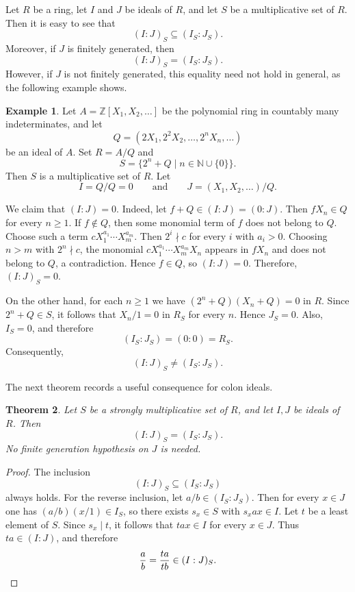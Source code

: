 \documentclass[11pt]{amsart}
\newtheorem{theorem}{Theorem}[section]
\theoremstyle{definition}
\newtheorem{example}[theorem]{Example}
\theoremstyle{remark}
\begin{document}
Let $R$ be a ring, let $I$ and $J$ be ideals of $R$, and let $S$ be a multiplicative set of $R$. Then it is easy to see that
\[
(I:J)_S\subseteq (I_S:J_S).
\]
Moreover, if $J$ is finitely generated, then
\[
(I:J)_S=(I_S:J_S).
\]
However, if $J$ is not finitely generated, this equality need not hold in general, as the following example shows.

\begin{example}\label{examplecolon}
Let $A=\mathbb{Z}[X_1,X_2,\ldots]$ be the polynomial ring in countably many indeterminates, and let
\[
Q=(2X_1,2^2X_2,\ldots,2^nX_n,\ldots)
\]
be an ideal of $A$. Set $R=A/Q$ and
\[
S=\{2^n+Q \mid n\in \mathbb{N}\cup\{0\}\}.
\]
Then $S$ is a multiplicative set of $R$. Let
\[
I=Q/Q=0
\qquad\text{and}\qquad
J=(X_1,X_2,\ldots)/Q.
\]

We claim that $(I:J)=0$. Indeed, let $f+Q\in (I:J)=(0:J)$. Then $fX_n\in Q$ for every $n\geq 1$. If $f\notin Q$, then some monomial term of $f$ does not belong to $Q$. Choose such a term $cX_1^{a_1}\cdots X_m^{a_m}.$
Then $2^i\nmid c$ for every $i$ with $a_i>0$. Choosing $n>m$ with $2^n\nmid c$, the monomial $cX_1^{a_1}\cdots X_m^{a_m}X_n$ appears in $fX_n$ and does not belong to $Q$, a contradiction. Hence $f\in Q$, so $(I:J)=0$. Therefore,
$(I:J)_S=0.$

On the other hand, for each $n\geq 1$ we have $(2^n+Q)(X_n+Q)=0$ in $R$. Since $2^n+Q\in S$, it follows that $X_n/1=0$ in $R_S$ for every $n$. Hence $J_S=0$. Also, $I_S=0$, and therefore
\[
(I_S:J_S)=(0:0)=R_S.
\]
Consequently,
\[
(I:J)_S\neq (I_S:J_S).
\]
\end{example}

The next theorem records a useful consequence for colon ideals.

\begin{theorem}\label{thm:colon}
Let $S$ be a strongly multiplicative set of $R$, and let $I,J$ be ideals of $R$.
Then
\[
(I:J)_S=(I_S:J_S).
\]
No finite generation hypothesis on $J$ is needed.
\end{theorem}

\begin{proof}
The inclusion
\[
(I:J)_S\subseteq (I_S:J_S)
\]
always holds.
For the reverse inclusion, let $a/b \in (I_S:J_S)$.
Then for every $x \in J$ one has $(a/b)(x/1)\in I_S$, so there exists $s_x \in S$ with $s_xax \in I$.
Let $t$ be a least element of $S$.
Since $s_x \mid t$, it follows that $tax \in I$ for every $x \in J$.
Thus $ta \in (I:J)$, and therefore
\[
\frac{a}{b}=\frac{ta}{tb}\in (I:J)_S. \qedhere
\]
\end{proof}
\end{document}
